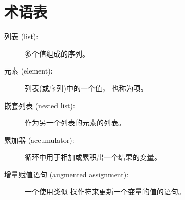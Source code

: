 \section{术语表}

\begin{description}


\item[列表 (list):] 多个值组成的序列。


\item[元素 (element):] 列表(或序列)中的一个值， 也称为项。


\item[嵌套列表 (nested list):] 作为另一个列表的元素的列表。


\item[累加器 (accumulator):] 循环中用于相加或累积出一个结果的变量。


\item[增量赋值语句 (augmented assignment):] 一个使用类似 \li{+=} 操作符来更新一个变量的值的语句。
  



\end{description}

